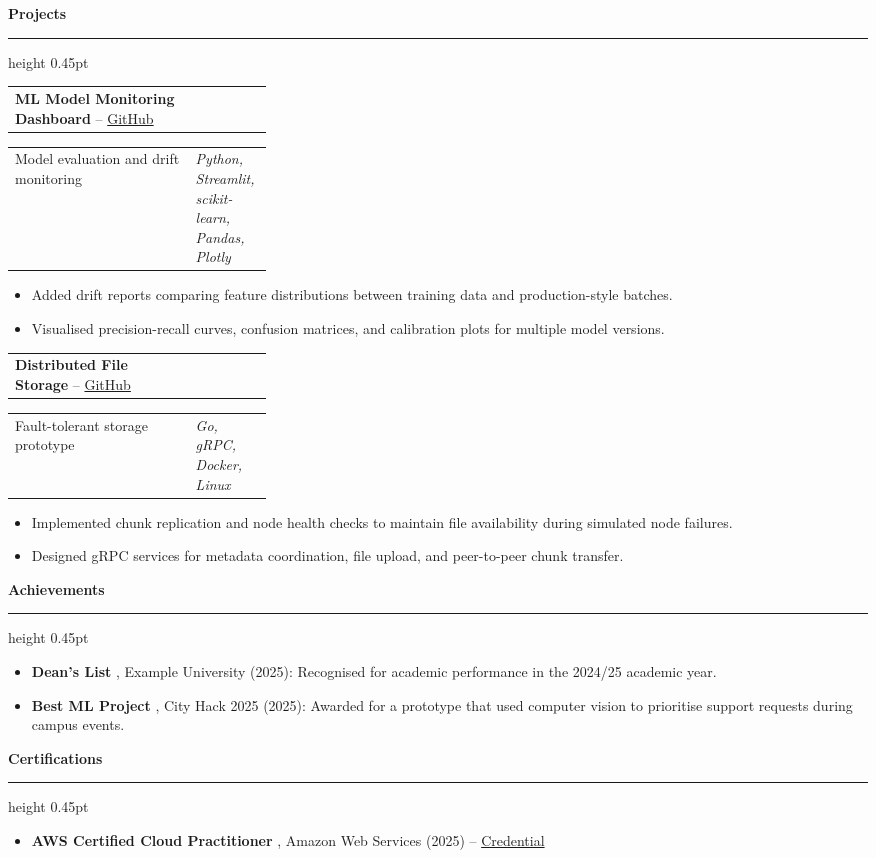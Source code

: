 \documentclass[10pt,a4paper]{article}
\makeatletter
\newcommand{\cvsection}[1]{%
  \vspace{6pt}%
  {\large\bfseries\color{AccentBlue} #1}\\[-2pt]%
  {\color{AccentBlue}\hrule height 0.45pt}%
  \vspace{3pt}%
}
\newcommand{\cvrow}[2]{%
  \begin{tabularx}{\linewidth}{@{}X>{\raggedleft\arraybackslash}p{0.30\linewidth}@{}}
    #1 & #2
  \end{tabularx}
}
\newcommand{\cventryspace}{\vspace{2pt}}
\makeatother
\begin{document}
\cvsection{ Projects }
\cvrow{\textbf{ ML Model Monitoring Dashboard } -- \href{\detokenize{https://github.com/example/ml-monitoring-dashboard}}{GitHub}}{ 2026 }
\cvrow{ Model evaluation and drift monitoring }{ \textit{ Python, Streamlit, scikit-learn, Pandas, Plotly } }
\begin{itemize}
  \item Added drift reports comparing feature distributions between training data and production-style batches.
  \item Visualised precision-recall curves, confusion matrices, and calibration plots for multiple model versions.
\end{itemize}
\cventryspace
\cvrow{\textbf{ Distributed File Storage } -- \href{\detokenize{https://github.com/example/distributed-file-storage}}{GitHub}}{ 2026 }
\cvrow{ Fault-tolerant storage prototype }{ \textit{ Go, gRPC, Docker, Linux } }
\begin{itemize}
  \item Implemented chunk replication and node health checks to maintain file availability during simulated node failures.
  \item Designed gRPC services for metadata coordination, file upload, and peer-to-peer chunk transfer.
\end{itemize}
\cventryspace

\cvsection{ Achievements }
\begin{itemize}
  \item \textbf{ Dean's List }, Example University (2025): Recognised for academic performance in the 2024/25 academic year.
  \item \textbf{ Best ML Project }, City Hack 2025 (2025): Awarded for a prototype that used computer vision to prioritise support requests during campus events.
\end{itemize}

\cvsection{ Certifications }
\begin{itemize}
  \item \textbf{ AWS Certified Cloud Practitioner }, Amazon Web Services (2025) -- \href{ \detokenize{https://aws.amazon.com/certification/} }{Credential}

\end{itemize}
\end{document}
